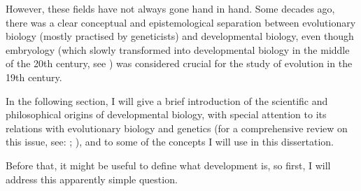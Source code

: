 However, these fields have not always gone hand in hand. Some decades ago, there was a clear conceptual and epistemological separation between evolutionary biology (mostly practised by geneticists) and developmental biology, even though embryology (which slowly transformed into developmental biology in the middle of the 20th century, see \citealp{Horder2010}) was considered crucial for the study of evolution in the 19th century.

In the following section, I will give a brief introduction of the scientific and philosophical origins of developmental biology, with special attention to its relations with evolutionary biology and genetics (for a comprehensive review on this issue, see: \citealp{amundson2005changing}; \citealp{gilbert1991conceptual}), and to some of the concepts I will use in this dissertation.

Before that, it might be useful to define what development is, so first, I will address this apparently simple question.